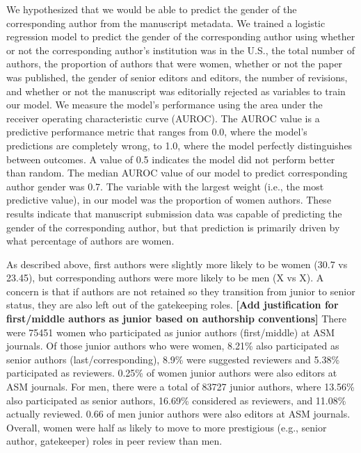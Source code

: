 \documentclass[11pt,]{article}
\begin{document}
We hypothesized that we would be able to predict the gender of the
corresponding author from the manuscript metadata. We trained a logistic
regression model to predict the gender of the corresponding author using
whether or not the corresponding author's institution was in the U.S.,
the total number of authors, the proportion of authors that were women,
whether or not the paper was published, the gender of senior editors and
editors, the number of revisions, and whether or not the manuscript was
editorially rejected as variables to train our model. We measure the
model's performance using the area under the receiver operating
characteristic curve (AUROC). The AUROC value is a predictive
performance metric that ranges from 0.0, where the model's predictions
are completely wrong, to 1.0, where the model perfectly distinguishes
between outcomes. A value of 0.5 indicates the model did not perform
better than random. The median AUROC value of our model to predict
corresponding author gender was 0.7. The variable with the largest
weight (i.e., the most predictive value), in our model was the
proportion of women authors. These results indicate that manuscript
submission data was capable of predicting the gender of the
corresponding author, but that prediction is primarily driven by what
percentage of authors are women.

As described above, first authors were slightly more likely to be women
(30.7 vs 23.45), but corresponding authors were more likely to be men (X
vs X). A concern is that if authors are not retained so they transition
from junior to senior status, they are also left out of the gatekeeping
roles. \textbf{{[}Add justification for first/middle authors as junior
based on authorship conventions{]}} There were 75451 women who
participated as junior authors (first/middle) at ASM journals. Of those
junior authors who were women, 8.21\% also participated as senior
authors (last/corresponding), 8.9\% were suggested reviewers and 5.38\%
participated as reviewers. 0.25\% of women junior authors were also
editors at ASM journals. For men, there were a total of 83727 junior
authors, where 13.56\% also participated as senior authors, 16.69\%
considered as reviewers, and 11.08\% actually reviewed. 0.66 of men
junior authors were also editors at ASM journals. Overall, women were
half as likely to move to more prestigious (e.g., senior author,
gatekeeper) roles in peer review than men.
\end{document}
